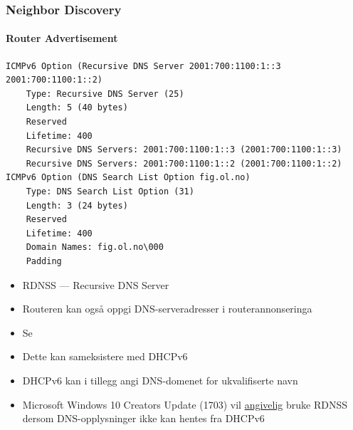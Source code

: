 \begin{frame}[fragile]
  \frametitle{Neighbor Discovery}
  \framesubtitle{Router Advertisement}
  \begin{multicols}{2}
\begin{Verbatim}[fontsize=\tiny]
ICMPv6 Option (Recursive DNS Server 2001:700:1100:1::3 2001:700:1100:1::2)
    Type: Recursive DNS Server (25)
    Length: 5 (40 bytes)
    Reserved
    Lifetime: 400
    Recursive DNS Servers: 2001:700:1100:1::3 (2001:700:1100:1::3)
    Recursive DNS Servers: 2001:700:1100:1::2 (2001:700:1100:1::2)
ICMPv6 Option (DNS Search List Option fig.ol.no)
    Type: DNS Search List Option (31)
    Length: 3 (24 bytes)
    Reserved
    Lifetime: 400
    Domain Names: fig.ol.no\000
    Padding
\end{Verbatim}
  \columnbreak
  \begin{itemize}
  \item RDNSS --- Recursive DNS Server
  \item Routeren kan også oppgi DNS-serveradresser i routerannonseringa
  \item Se 
  \item Dette kan sameksistere med DHCPv6
  \item DHCPv6 kan i tillegg angi DNS-domenet for ukvalifiserte navn
  \item Microsoft Windows 10 Creators Update (1703) vil
    \href{https://insinuator.net/2017/05/one-step-closer-rdnss-rfc-8106-support-in-windows-10-creators-update/}{angivelig}
    bruke RDNSS dersom DNS-opplysninger ikke kan hentes fra DHCPv6
  \end{itemize}
  \end{multicols}
\end{frame}

